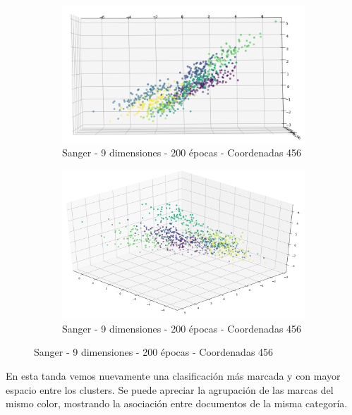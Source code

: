 \begin{figure}[!htbp]
\centering
\begin{subfigure}{.5\textwidth}
  \centering
  \includegraphics[width=1\linewidth, scale=1]{../img/ej1/sanger_corrida_200_9/sanger_9salida_200ep_testing_dim456_3.png}
  \caption{Sanger - 9 dimensiones - 200 épocas - Coordenadas 456}
  \label{fig:sub1}
\end{subfigure}%
\begin{subfigure}{.5\textwidth}
  \centering
  \includegraphics[width=1\linewidth, scale=1]{../img/ej1/sanger_corrida_200_9/sanger_9salida_200ep_testing_dim456_4.png}
  \caption{Sanger - 9 dimensiones - 200 épocas - Coordenadas 456}
  \label{fig:sub2}
\end{subfigure}
\end{figure}

En esta tanda vemos nuevamente una clasificación más marcada y con mayor espacio entre los clusters. Se puede apreciar la agrupación
de las marcas del mismo color, mostrando la asociación entre documentos de la misma categoría.

